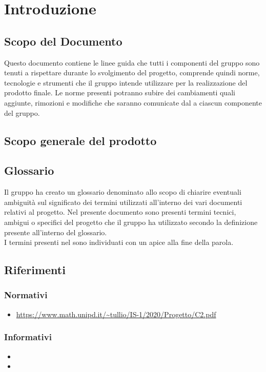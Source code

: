 \section{Introduzione}
\subsection{Scopo del Documento}
Questo documento contiene le linee guida che tutti i componenti del gruppo sono tenuti a rispettare durante lo svolgimento del progetto, comprende quindi norme, tecnologie e strumenti che il gruppo \Gruppo intende utilizzare per la realizzazione del prodotto finale. 
Le norme presenti potranno subire dei cambiamenti quali aggiunte, rimozioni e modifiche che saranno comunicate dal \Responsabile a ciascun componente del gruppo.

\subsection{Scopo generale del prodotto}

\subsection{Glossario}
Il gruppo ha creato un glossario denominato \Glossariov{} allo scopo di chiarire eventuali ambiguità sul significato dei termini utilizzati all'interno dei vari documenti relativi al progetto. Nel presente documento sono presenti termini tecnici, ambigui o specifici del progetto che il gruppo ha utilizzato secondo la definizione presente all'interno del glossario. \\
I termini presenti nel \Glossario sono individuati con un apice  alla fine della parola.

\subsection{Riferimenti}
\subsubsection{Normativi}
\begin{itemize}
\item \url{https://www.math.unipd.it/~tullio/IS-1/2020/Progetto/C2.pdf}
\end{itemize}

\subsubsection{Informativi}
\begin{itemize}
\item \PdPv{}
\item \PdQv{}
\end{itemize}